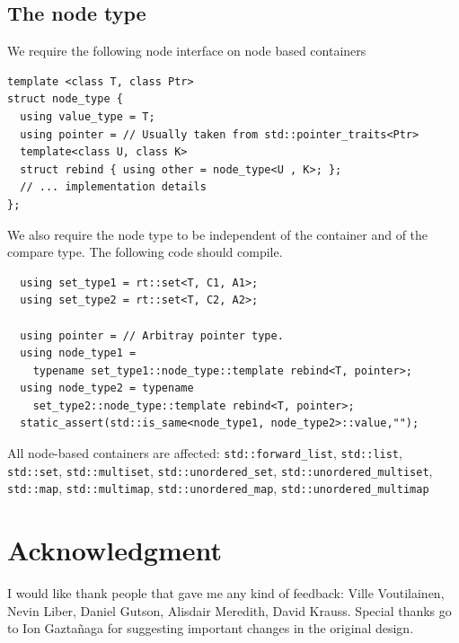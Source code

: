 \documentclass[11pt]{article}
\begin{document}
\subsection{The node type}

We require the following node interface on node based containers

\begin{lstlisting}
template <class T, class Ptr>
struct node_type {
  using value_type = T;
  using pointer = // Usually taken from std::pointer_traits<Ptr>
  template<class U, class K>
  struct rebind { using other = node_type<U , K>; };
  // ... implementation details
};
\end{lstlisting}

We also require the node type to be independent of the container
and of the compare type. The following code should compile.

\begin{lstlisting}
  using set_type1 = rt::set<T, C1, A1>;
  using set_type2 = rt::set<T, C2, A2>;

  using pointer = // Arbitray pointer type.
  using node_type1 =
    typename set_type1::node_type::template rebind<T, pointer>;
  using node_type2 = typename
    set_type2::node_type::template rebind<T, pointer>;
  static_assert(std::is_same<node_type1, node_type2>::value,"");
\end{lstlisting}

All node-based containers are affected: \texttt{std::forward\_list},
\texttt{std::list}, \texttt{std::set}, \texttt{std::multiset},
\texttt{std::unordered\_set}, \texttt{std::unordered\_multiset},
\texttt{std::map}, \texttt{std::multimap},
\texttt{std::unordered\_map}, \texttt{std::unordered\_multimap}

\section{Acknowledgment}

I would like thank people that gave me any kind of feedback: Ville Voutilainen,
Nevin Liber, Daniel Gutson, Alisdair Meredith, David Krauss. Special thanks go
to Ion Gaztañaga for suggesting important changes in the original design.
\end{document}
